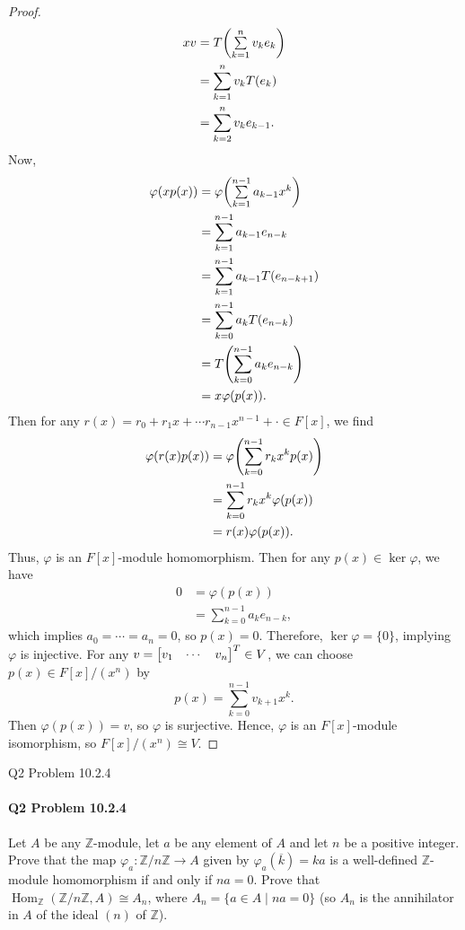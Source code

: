 \documentclass[12pt]{article}
\newenvironment{fullbox}{\begin{lrbox}{\savefullbox}\begin{minipage}{\dimexpr\textwidth-2\fboxsep\relax}}{\end{minipage}\end{lrbox}\begin{center}\framebox[\textwidth]{\usebox{\savefullbox}}\end{center}}
\newenvironment{pbox}[1][]{\begin{fullbox}\ifx#1\empty\else\paragraph{#1}\fi}{\end{fullbox}}
\theoremstyle{definition}
\newcommand{\Z}{\mathbb{Z}}
\renewcommand{\phi}{\varphi}
\newcommand{\isom}{\cong}
\newcommand{\eqc}{\overline}
\newcommand{\Hom}{\operatorname{Hom}}
\newcommand{\tsum}{\textstyle\sum\limits}
\begin{document}
\begin{proof}
\begin{align*}
        xv
            &= T\qty(\tsum_{k=1}^{n} v_k e_k) \\
            &= \sum_{k=1}^{n} v_kT(e_k) \\
            &= \sum_{k=2}^{n} v_k e_{k-1}.
    \end{align*}
    Now,
    \begin{align*}
        \phi(xp(x))
            &= \phi\qty(\tsum_{k=1}^{n-1} a_{k-1} x^k) \\
            &= \sum_{k=1}^{n-1} a_{k-1} e_{n-k} \\
            &= \sum_{k=1}^{n-1} a_{k-1} T(e_{n-k+1}) \\
            &= \sum_{k=0}^{n-1} a_k T(e_{n-k}) \\
            &= T\qty(\sum_{k=0}^{n-1} a_k e_{n-k}) \\
            &= x\phi(p(x)).
    \end{align*}
    Then for any $r(x) = r_0 + r_1x + \cdots r_{n-1}x^{n-1} + \cdot \in F[x]$, we find
    \begin{align*}
        \phi(r(x)p(x))
            &= \phi\qty(\sum_{k=0}^{n-1} r_k x^k p(x)) \\
            &= \sum_{k=0}^{n-1} r_k x^k \phi(p(x)) \\
            &= r(x) \phi(p(x)).
    \end{align*}
    Thus, $\phi$ is an $F[x]$-module homomorphism. Then for any $p(x) \in \ker\phi$, we have
    \begin{align*}
        0
            &= \phi(p(x)) \\
            &= \sum_{k=0}^{n-1} a_k e_{n-k},
    \end{align*}
    which implies $a_0 = \cdots = a_n = 0$, so $p(x) = 0$. Therefore, $\ker\phi = \{0\}$, implying $\phi$ is injective. For any $v = \mqty[v_1 & \cdots & v_n]^T \in V$, we can choose $p(x) \in F[x]/(x^n)$ by
    \[
        p(x) = \sum_{k=0}^{n-1} v_{k+1} x^k.
    \]
    Then $\phi(p(x)) = v$, so $\phi$ is surjective. Hence, $\phi$ is an $F[x]$-module isomorphism, so $F[x]/(x^n) \isom V$.
    
\end{proof}



\newpage
\begin{pbox}[Q2 Problem 10.2.4]
    Let $A$ be any $\Z$-module, let $a$ be any element of $A$ and let $n$ be a positive integer. Prove that the map $\phi_a : \Z/n\Z \to A$ given by $\phi_a(\eqc{k}) = ka$ is a well-defined $\Z$-module homomorphism if and only if $na = 0$. Prove that $\Hom_\Z(\Z/n\Z, A) \isom A_n$, where $A_n = \{a \in A \mid na = 0\}$ (so $A_n$ is the annihilator in $A$ of the ideal $(n)$ of $\Z$).
\end{pbox}
\end{document}
